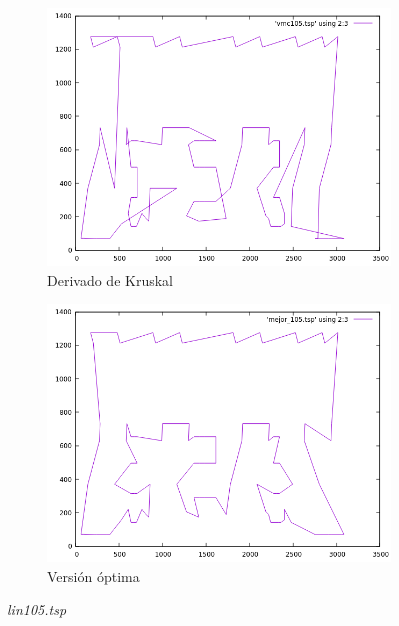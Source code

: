 \documentclass[12pt,spanish]{article}
\begin{document}
\begin{figure}[H]
\begin{subfigure}[b]{0.36\textwidth}
\includegraphics[width=\textwidth]{lin105_vmc.png}
\caption{Derivado de Kruskal}
\end{subfigure}
\quad
\begin{subfigure}[b]{0.36\textwidth}
\includegraphics[width=\textwidth]{lin105_mejor.png}
\caption{Versión óptima}
\end{subfigure}
\caption{\textit{lin105.tsp}}
\end{figure}
\end{document}
